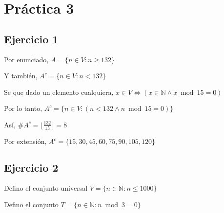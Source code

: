 
\usepackage{caratula}
\usepackage{enumerate}
\usepackage{hyperref}
\usepackage{graphicx}
\usepackage{amsfonts}
\usepackage{enumitem}
\usepackage{amsmath}

\decimalpoint
\hypersetup{colorlinks=true, linkcolor=black, urlcolor=blue}
\setlength{\parindent}{0em}
\setlength{\parskip}{0.5em}
\setcounter{tocdepth}{2} %
\setcounter{section}{2} %
\renewcommand{\thesubsubsection}{\thesubsection.\Alph{subsubsection}}
\graphicspath{ {images/} }





\maketitle
\newpage

\tableofcontents
\newpage

\section{Práctica 3}

\subsection{Ejercicio 1}

Por enunciado, $ A= \{ n \in V: n \geq 132 \} $

Y también, $ A^c = \{ n \in V: n < 132 \} $

Se que dado un elemento cualquiera, $ x \in V \iff (x \in \mathbb{N} \wedge x \bmod 15 = 0)$

Por lo tanto, $ A^c = \{ n \in V: (n < 132 \wedge n \bmod 15 = 0) \} $

Así, $ \#A^c = \lfloor \frac{132}{15} \rfloor = 8 $

Por extensión, $ A^c = \{ 15,30,45,60,75,90,105,120 \} $

\subsection{Ejercicio 2}

Defino el conjunto universal $ V = \{ n \in \mathbb{N}: n \leq 1000 \} $

Defino el conjunto $ T = \{ n \in \mathbb{N}: n \bmod 3 = 0 \} $

